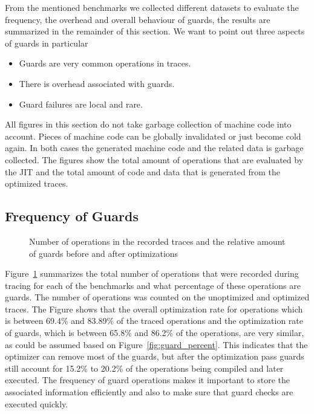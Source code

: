 \documentclass[10pt,preprint]{sigplanconf}
\begin{document}
From the mentioned benchmarks we collected different datasets to evaluate the
frequency, the overhead and overall behaviour of guards, the results are
summarized in the remainder of this section. We want to point out three
aspects of guards in particular
\begin{itemize}
  \item Guards are very common operations in traces.
  \item There is overhead associated with guards.
  \item Guard failures are local and rare.
\end{itemize}

All figures in this section do not take garbage collection of machine code into account. Pieces
of machine code can be globally invalidated or just become cold again. In both
cases the generated machine code and the related data is garbage collected. The
figures show the total amount of operations that are evaluated by the JIT and
the total amount of code and data that is generated from the optimized traces.


\subsection{Frequency of Guards}
\label{sub:guard_frequency}
\begin{figure}
    
    \caption{Number of operations in the recorded traces and the relative amount of guards before and after optimizations}
    \label{fig:benchmarks}
\end{figure}

Figure~\ref{fig:benchmarks} summarizes the total number of operations that were
recorded during tracing for each of the benchmarks and what percentage of these
operations are guards. The number of operations was counted on the unoptimized
and optimized traces. The Figure shows that the overall optimization rate for
operations which is between 69.4\% and 83.89\% of the traced operations and the
optimization rate of guards, which is between 65.8\% and 86.2\% of the
operations, are very similar, as could be assumed based on
Figure~\ref{fig:guard_percent}. This indicates that the optimizer can remove
most of the guards, but after the optimization pass guards still account for
15.2\% to 20.2\% of the operations being compiled and later executed.
The frequency of guard operations makes it important to store the associated
information efficiently and also to make sure that guard checks are executed
quickly.
\end{document}
